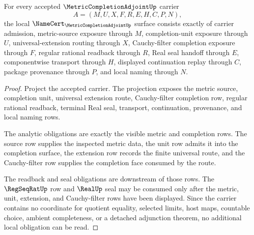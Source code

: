 \begin{theorem}
\label{thm:metric-completion-adjoint-namecert-obligations}
For every accepted $\MetricCompletionAdjointUp$ carrier
$$
A=(M,U,X,F,R,E,H,C,P,N),
$$
the local $\NameCert_{\MetricCompletionAdjointUp}$ surface consists exactly of carrier admission, metric-source exposure through $M$, completion-unit exposure through $U$, universal-extension routing through $X$, Cauchy-filter completion exposure through $F$, regular rational readback through $R$, Real seal handoff through $E$, componentwise transport through $H$, displayed continuation replay through $C$, package provenance through $P$, and local naming through $N$.
\end{theorem}
\begin{proof}
Project the accepted carrier. The projection exposes the metric source, completion unit, universal extension route, Cauchy-filter completion row, regular rational readback, terminal Real seal, transport, continuation, provenance, and local naming rows.

The analytic obligations are exactly the visible metric and completion rows. The source row supplies the inspected metric data, the unit row admits it into the completion surface, the extension row records the finite universal route, and the Cauchy-filter row supplies the completion face consumed by the route.

The readback and seal obligations are downstream of those rows. The $\RegSeqRatUp$ row and $\RealUp$ seal may be consumed only after the metric, unit, extension, and Cauchy-filter rows have been displayed. Since the carrier contains no coordinate for quotient equality, selected limits, host maps, countable choice, ambient completeness, or a detached adjunction theorem, no additional local obligation can be read.
\end{proof}

